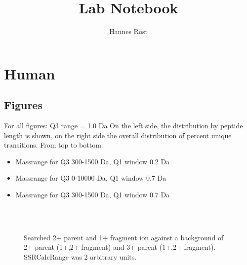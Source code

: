 

\usepackage{gensymb}
\usepackage{hyphenat}
\usepackage{subfig}



\author{Hannes Röst}
\title{Lab Notebook}
\maketitle

\tableofcontents

\section{Human}

\subsection{Figures}


For all figures:
Q3 range = 1.0 Da
On the left side, the distribution by peptide length is shown, on the right side the overall distribution of percent unique transitions.
From top to bottom: 
\begin{itemize}
\item Massrange for Q3 300-1500 Da, Q1 window 0.2 Da
\item Massrange for Q3 0-10000  Da, Q1 window 0.7 Da
\item Massrange for Q3 300-1500 Da, Q1 window 0.7 Da
\end{itemize}

\begin{figure}

\\
\\

\label{label1}
\caption{
Searched 2+ parent and 1+ fragment ion against a background of 2+ parent (1+,2+ fragment) and 3+ parent (1+,2+ fragment).
SSRCalcRange was 2 arbitrary units.
}
\end{figure}

